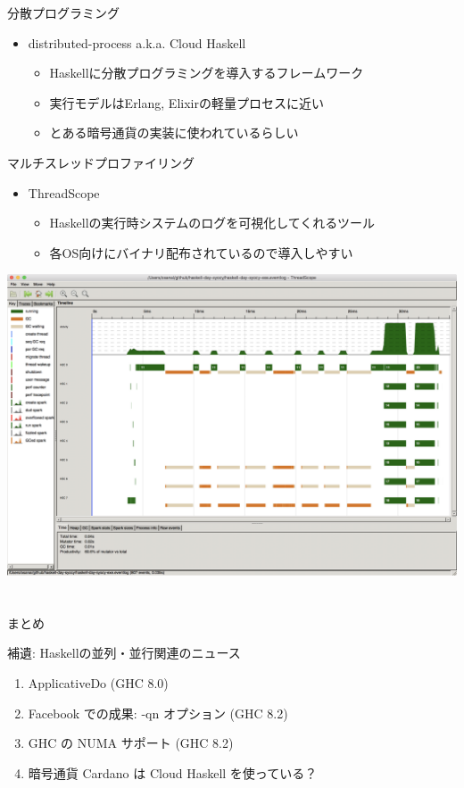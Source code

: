 \documentclass[unicode,12pt]{beamer}
\begin{document}
\begin{frame}{分散プログラミング}
  \begin{itemize}
  \item distributed-process a.k.a. Cloud Haskell
    \begin{itemize}
    \item Haskellに分散プログラミングを導入するフレームワーク
    \item 実行モデルはErlang, Elixirの軽量プロセスに近い
    \item とある暗号通貨の実装に使われているらしい
    \end{itemize}
  \end{itemize}
\end{frame}

\begin{frame}{マルチスレッドプロファイリング}
  \begin{itemize}
  \item ThreadScope
    \begin{itemize}
    \item Haskellの実行時システムのログを可視化してくれるツール
    \item 各OS向けにバイナリ配布されているので導入しやすい
    \end{itemize}
  \end{itemize}
  \centering
  \includegraphics[width=.5\textwidth]{pic/threadscope.png}
\end{frame}

\section{}

\begin{frame}{まとめ}

\end{frame}

\begin{frame}[plain]{補遺: Haskellの並列・並行関連のニュース}
  \begin{enumerate}
  \item ApplicativeDo (GHC 8.0)
  \item Facebook での成果: -qn オプション (GHC 8.2)
  \item GHC の NUMA サポート (GHC 8.2)
  \item 暗号通貨 Cardano は Cloud Haskell を使っている？
  \end{enumerate}
\end{frame}
\end{document}
